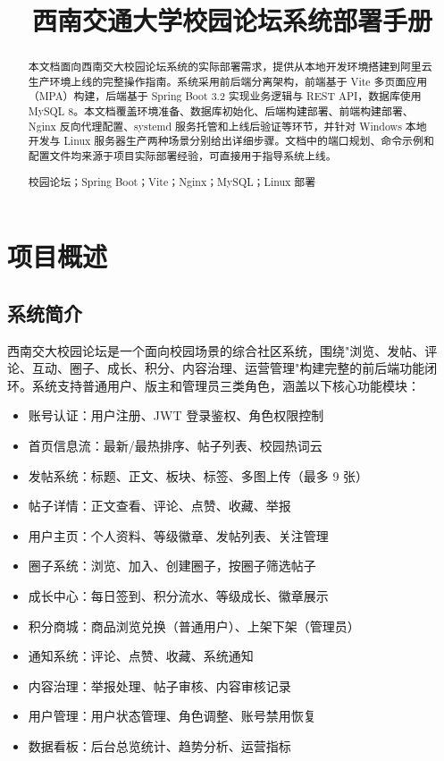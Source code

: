 \documentclass[bwprint]{report}
\title{西南交通大学校园论坛系统部署手册}
\begin{document}
\maketitle
\newpage

\pagestyle{plain}
\begin{abstract}

本文档面向西南交大校园论坛系统的实际部署需求，提供从本地开发环境搭建到阿里云生产环境上线的完整操作指南。系统采用前后端分离架构，前端基于 Vite 多页面应用（MPA）构建，后端基于 Spring Boot 3.2 实现业务逻辑与 REST API，数据库使用 MySQL 8。本文档覆盖环境准备、数据库初始化、后端构建部署、前端构建部署、Nginx 反向代理配置、systemd 服务托管和上线后验证等环节，并针对 Windows 本地开发与 Linux 服务器生产两种场景分别给出详细步骤。文档中的端口规划、命令示例和配置文件均来源于项目实际部署经验，可直接用于指导系统上线。

\vspace{0.5em}
校园论坛；Spring Boot；Vite；Nginx；MySQL；Linux 部署
\end{abstract}

\tableofcontents
\newpage
\pagestyle{plain}

\setcounter{page}{1}

\section{项目概述}

\subsection{系统简介}

西南交大校园论坛是一个面向校园场景的综合社区系统，围绕"浏览、发帖、评论、互动、圈子、成长、积分、内容治理、运营管理"构建完整的前后端功能闭环。系统支持普通用户、版主和管理员三类角色，涵盖以下核心功能模块：

\begin{itemize}
    \item 账号认证：用户注册、JWT 登录鉴权、角色权限控制
    \item 首页信息流：最新/最热排序、帖子列表、校园热词云
    \item 发帖系统：标题、正文、板块、标签、多图上传（最多 9 张）
    \item 帖子详情：正文查看、评论、点赞、收藏、举报
    \item 用户主页：个人资料、等级徽章、发帖列表、关注管理
    \item 圈子系统：浏览、加入、创建圈子，按圈子筛选帖子
    \item 成长中心：每日签到、积分流水、等级成长、徽章展示
    \item 积分商城：商品浏览兑换（普通用户）、上架下架（管理员）
    \item 通知系统：评论、点赞、收藏、系统通知
    \item 内容治理：举报处理、帖子审核、内容审核记录
    \item 用户管理：用户状态管理、角色调整、账号禁用恢复
    \item 数据看板：后台总览统计、趋势分析、运营指标
\end{itemize}
\end{document}
